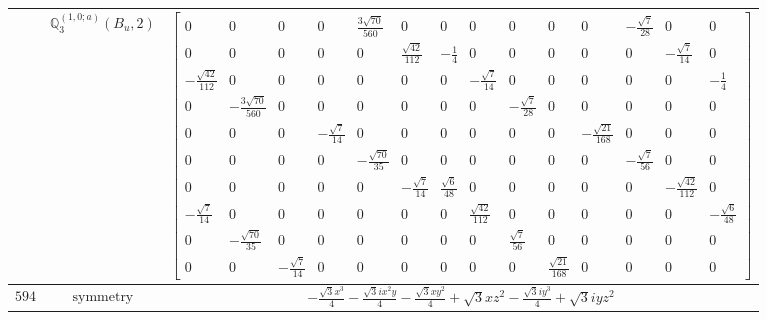 \documentclass[fleqn,8pt,landscape]{jsarticle}
\begin{document}
\begin{longtable}{ccc}
$  $ & $ \mathbb{Q}_{3}^{(1,0;a)}(B_{u},2) $ & $ \begin{bmatrix} 0 & 0 & 0 & 0 & \frac{3 \sqrt{70}}{560} & 0 & 0 & 0 & 0 & 0 & 0 & - \frac{\sqrt{7}}{28} & 0 & 0 \\ 0 & 0 & 0 & 0 & 0 & \frac{\sqrt{42}}{112} & - \frac{1}{4} & 0 & 0 & 0 & 0 & 0 & - \frac{\sqrt{7}}{14} & 0 \\ - \frac{\sqrt{42}}{112} & 0 & 0 & 0 & 0 & 0 & 0 & - \frac{\sqrt{7}}{14} & 0 & 0 & 0 & 0 & 0 & - \frac{1}{4} \\ 0 & - \frac{3 \sqrt{70}}{560} & 0 & 0 & 0 & 0 & 0 & 0 & - \frac{\sqrt{7}}{28} & 0 & 0 & 0 & 0 & 0 \\ 0 & 0 & 0 & - \frac{\sqrt{7}}{14} & 0 & 0 & 0 & 0 & 0 & 0 & - \frac{\sqrt{21}}{168} & 0 & 0 & 0 \\ 0 & 0 & 0 & 0 & - \frac{\sqrt{70}}{35} & 0 & 0 & 0 & 0 & 0 & 0 & - \frac{\sqrt{7}}{56} & 0 & 0 \\ 0 & 0 & 0 & 0 & 0 & - \frac{\sqrt{7}}{14} & \frac{\sqrt{6}}{48} & 0 & 0 & 0 & 0 & 0 & - \frac{\sqrt{42}}{112} & 0 \\ - \frac{\sqrt{7}}{14} & 0 & 0 & 0 & 0 & 0 & 0 & \frac{\sqrt{42}}{112} & 0 & 0 & 0 & 0 & 0 & - \frac{\sqrt{6}}{48} \\ 0 & - \frac{\sqrt{70}}{35} & 0 & 0 & 0 & 0 & 0 & 0 & \frac{\sqrt{7}}{56} & 0 & 0 & 0 & 0 & 0 \\ 0 & 0 & - \frac{\sqrt{7}}{14} & 0 & 0 & 0 & 0 & 0 & 0 & \frac{\sqrt{21}}{168} & 0 & 0 & 0 & 0 \end{bmatrix} $ \\ \hline
$ 594 $ & $ \text{symmetry} $ & $ - \frac{\sqrt{3} x^{3}}{4} - \frac{\sqrt{3} i x^{2} y}{4} - \frac{\sqrt{3} x y^{2}}{4} + \sqrt{3} x z^{2} - \frac{\sqrt{3} i y^{3}}{4} + \sqrt{3} i y z^{2} $ \\

\end{longtable}
\end{document}
